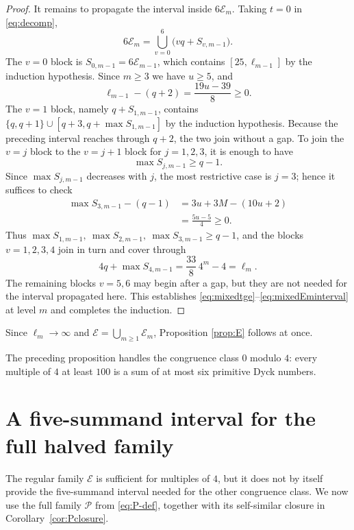 \documentclass[12pt]{article}
\theoremstyle{plain}
\theoremstyle{definition}
\theoremstyle{plain}
\newcommand{\Pset}{\mathcal{P}}
\begin{document}
\begin{proof}
It remains to propagate the interval inside $6\mathcal E_{m}$.  Taking
$t=0$ in \eqref{eq:decomp},
\[
 6\mathcal E_{m}=\bigcup_{v=0}^{6}\bigl(vq+S_{v,m-1}\bigr).
\]
The $v=0$ block is $S_{0,m-1}=6\mathcal E_{m-1}$, which contains
$[25,\ell_{m-1}]$ by the induction hypothesis.  Since $m\geq3$ we have
$u\geq5$, and
\[
 \ell_{m-1}-(q+2)=\frac{19u-39}{8}\geq0 .
\]
The $v=1$ block, namely $q+S_{1,m-1}$, contains
$\{q,q+1\}\cup[q+3,q+\max S_{1,m-1}]$ by the induction hypothesis.
Because the preceding interval reaches through $q+2$, the two join
without a gap.  To join the $v=j$ block to the $v=j+1$ block for
$j=1,2,3$, it is enough to have
\[
 \max S_{j,m-1}\geq q-1.
\]
Since $\max S_{j,m-1}$ decreases with $j$, the most restrictive case is
$j=3$; hence it suffices to check
\[
\begin{aligned}
 \max S_{3,m-1}-(q-1)
 &=3u+3M-(10u+2)\\
 &=\frac{5u-5}{4}\geq0 .
\end{aligned}
\]
Thus $\max S_{1,m-1},\ \max S_{2,m-1},\ \max S_{3,m-1}\geq q-1$, and
the blocks $v=1,2,3,4$ join in turn and cover through
\[
 4q+\max S_{4,m-1}=\frac{33}{8}\,4^m-4=\ell_{m} .
\]
The remaining blocks $v=5,6$ may begin after a gap, but they are not
needed for the interval propagated here.  This establishes
\eqref{eq:mixedtge}--\eqref{eq:mixedEminterval} at level $m$ and
completes the induction.
\end{proof}

Since $\ell_{m}\to\infty$ and $\mathcal E=\bigcup_{m\geq1}\mathcal E_{m}$,
Proposition \ref{prop:E} follows at once.

The preceding proposition handles the congruence class $0$ modulo
$4$: every multiple of $4$ at least $100$ is a sum of at most six
primitive Dyck numbers.

\section{A five-summand interval for the full halved family}
\label{sec:five-interval}

The regular family $\mathcal E$ is sufficient for multiples of $4$, but it
does not by itself provide the five-summand interval needed for the other
congruence class.  We now use the full family $\Pset$ from
\eqref{eq:P-def}, together with its self-similar closure in
Corollary~\ref{cor:Pclosure}.
\end{document}

